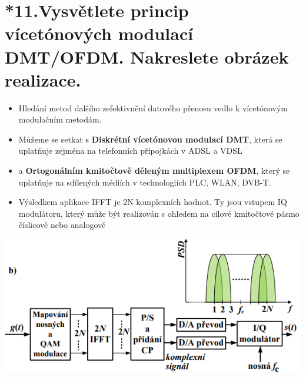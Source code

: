 \section{*11.Vysvětlete princip vícetónových modulací DMT/OFDM. Nakreslete obrázek realizace.}
\begin{itemize}
    \item Hledání metod dalšího zefektivnění datového přenosu vedlo k vícetónovým modulačním metodám.
    \item Můžeme se setkat s \textbf{Diskrétní vícetónovou modulací DMT}, která se uplatňuje zejména na telefonních přípojkách v ADSL a VDSL  
    \item a \textbf{Ortogonálním kmitočtově děleným multiplexem OFDM}, který se uplatňuje na sdílených médiích v technologiích PLC, WLAN, DVB-T. 
    \item Výsledkem aplikace IFFT je 2N komplexních hodnot. Ty jsou vstupem IQ modulátoru, který může být realizován s ohledem na cílové kmitočtové pásmo číslicově nebo analogově
\end{itemize}
    \includegraphics[]{images/image.png}
